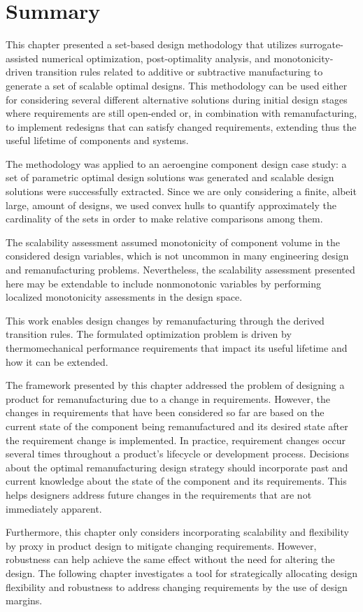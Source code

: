 \section{Summary}
\label{sec:scalableSBDsummary}

This chapter presented a set-based design methodology that utilizes surrogate-assisted numerical optimization, post-optimality analysis, and monotonicity-driven transition rules related to additive or subtractive manufacturing to generate a set of scalable optimal designs. This methodology can be used either for considering several different alternative solutions during initial design stages where requirements are still open-ended or, in combination with remanufacturing, to implement redesigns that can satisfy changed requirements, extending thus the useful lifetime of components and systems.

The methodology was applied to an aeroengine component design case study: a set of parametric optimal design solutions was generated and scalable design solutions were successfully extracted. Since we are only considering a finite, albeit large, amount of designs, we used convex hulls to quantify approximately the cardinality of the sets in order to make relative comparisons among them. 

The scalability assessment assumed monotonicity of component volume in the considered design variables, which is not uncommon in many engineering design and remanufacturing problems. Nevertheless, the scalability assessment presented here may be extendable to include nonmonotonic variables by performing localized monotonicity assessments in the design space.

This work enables design changes by remanufacturing through the derived transition rules. The formulated optimization problem is driven by thermomechanical performance requirements that impact its useful lifetime and how it can be extended.

The framework presented by this chapter addressed the problem of designing a product for remanufacturing due to a change in requirements. However, the changes in requirements that have been considered so far are based on the current state of the component being remanufactured and its desired state after the requirement change is implemented. In practice, requirement changes occur several times throughout a product's lifecycle or development process. Decisions about the optimal remanufacturing design strategy should incorporate past and current knowledge about the state of the component and its requirements. This helps designers address future changes in the requirements that are not immediately apparent.

Furthermore, this chapter only considers incorporating scalability and flexibility by proxy in product design to mitigate changing requirements. However, robustness can help achieve the same effect without the need for altering the design. The following chapter investigates a tool for strategically allocating design flexibility and robustness to address changing requirements by the use of design margins.
